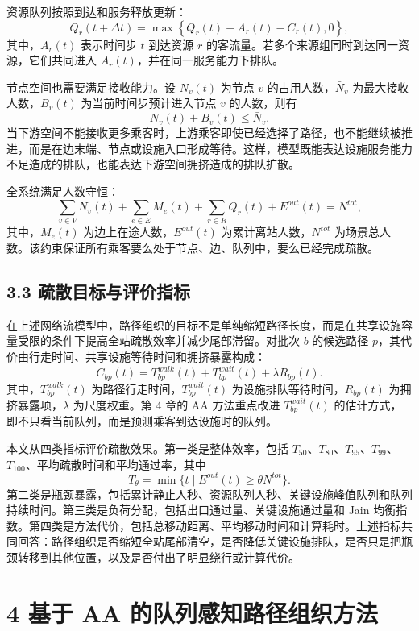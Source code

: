 \documentclass[UTF8,a4paper,12pt]{ctexart}
\begin{document}
资源队列按照到达和服务释放更新：
\[
Q_r(t+\Delta t)=
\max\left\{
Q_r(t)+A_r(t)-C_r(t),0
\right\},
\]
其中，\(A_r(t)\) 表示时间步 \(t\) 到达资源 \(r\) 的客流量。若多个来源组同时到达同一资源，它们共同进入 \(A_r(t)\)，并在同一服务能力下排队。

节点空间也需要满足接收能力。设 \(N_v(t)\) 为节点 \(v\) 的占用人数，\(\bar N_v\) 为最大接收人数，\(B_v(t)\) 为当前时间步预计进入节点 \(v\) 的人数，则有
\[
N_v(t)+B_v(t)\leq \bar N_v.
\]
当下游空间不能接收更多乘客时，上游乘客即使已经选择了路径，也不能继续被推进，而是在边末端、节点或设施入口形成等待。这样，模型既能表达设施服务能力不足造成的排队，也能表达下游空间拥挤造成的排队扩散。

全系统满足人数守恒：
\[
\sum_{v\in V}N_v(t)+\sum_{e\in E}M_e(t)+\sum_{r\in R}Q_r(t)+E^{out}(t)=N^{tot},
\]
其中，\(M_e(t)\) 为边上在途人数，\(E^{out}(t)\) 为累计离站人数，\(N^{tot}\) 为场景总人数。该约束保证所有乘客要么处于节点、边、队列中，要么已经完成疏散。

\subsection{3.3 疏散目标与评价指标}

在上述网络流模型中，路径组织的目标不是单纯缩短路径长度，而是在共享设施容量受限的条件下提高全站疏散效率并减少尾部滞留。对批次 \(b\) 的候选路径 \(p\)，其代价由行走时间、共享设施等待时间和拥挤暴露构成：
\[
C_{bp}(t)=T_{bp}^{walk}(t)+T_{bp}^{wait}(t)+\lambda R_{bp}(t).
\]
其中，\(T_{bp}^{walk}(t)\) 为路径行走时间，\(T_{bp}^{wait}(t)\) 为设施排队等待时间，\(R_{bp}(t)\) 为拥挤暴露项，\(\lambda\) 为尺度权重。第 4 章的 AA 方法重点改进 \(T_{bp}^{wait}(t)\) 的估计方式，即不只看当前队列，而是预测乘客到达设施时的队列。

本文从四类指标评价疏散效果。第一类是整体效率，包括 \(T_{50}\)、\(T_{80}\)、\(T_{95}\)、\(T_{99}\)、\(T_{100}\)、平均疏散时间和平均通过率，其中
\[
T_{\theta}=\min\{t\mid E^{out}(t)\geq \theta N^{tot}\}.
\]
第二类是瓶颈暴露，包括累计静止人秒、资源队列人秒、关键设施峰值队列和队列持续时间。第三类是负荷分配，包括出口通过量、关键设施通过量和 Jain 均衡指数。第四类是方法代价，包括总移动距离、平均移动时间和计算耗时。上述指标共同回答：路径组织是否缩短全站尾部清空，是否降低关键设施排队，是否只是把瓶颈转移到其他位置，以及是否付出了明显绕行或计算代价。

\section{4 基于 AA 的队列感知路径组织方法}
\end{document}
